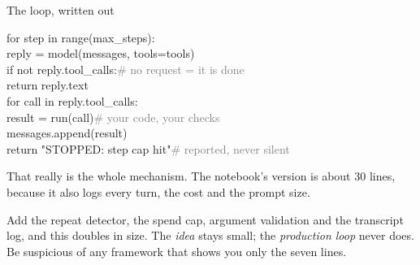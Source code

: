 \documentclass[aspectratio=169]{beamer}
\newcommand{\watchbox}[1]{%
  \begin{tcolorbox}[colback=armorange!12, colframe=armorange, boxrule=0.6pt, arc=2pt]
  #1
  \end{tcolorbox}}
\newcommand{\codebox}[1]{%
  \begin{center}
  \begin{tcolorbox}[colback=lightbg, colframe=gray, boxrule=0.5pt, arc=2pt,
                    width=0.94\textwidth, left=4pt, right=4pt, top=3pt, bottom=3pt]
    \ttfamily\scriptsize #1
  \end{tcolorbox}
  \end{center}}
\begin{document}
\begin{frame}{The loop, written out}
  \vspace{0.5em}
  \codebox{for step in range(max\_steps):\\
  \hspace*{1em}reply = model(messages, tools=tools)\\
  \hspace*{1em}if not reply.tool\_calls:\qquad\textcolor{gray}{\# no request = it is done}\\
  \hspace*{2em}return reply.text\\
  \hspace*{1em}for call in reply.tool\_calls:\\
  \hspace*{2em}result = run(call)\qquad\quad\textcolor{gray}{\# your code, your checks}\\
  \hspace*{2em}messages.append(result)\\
  return "STOPPED: step cap hit"\qquad\textcolor{gray}{\# reported, never silent}}

  \vspace{0.5em}
  That really is the whole mechanism. The notebook's version is about 30 lines, because it also
  logs every turn, the cost and the prompt size.

  \vspace{0.6em}
  \watchbox{\small Add the repeat detector, the spend cap, argument validation and the transcript
  log, and this doubles in size. The \emph{idea} stays small; the \emph{production loop} never
  does. Be suspicious of any framework that shows you only the seven lines.}
\end{frame}
\end{document}
